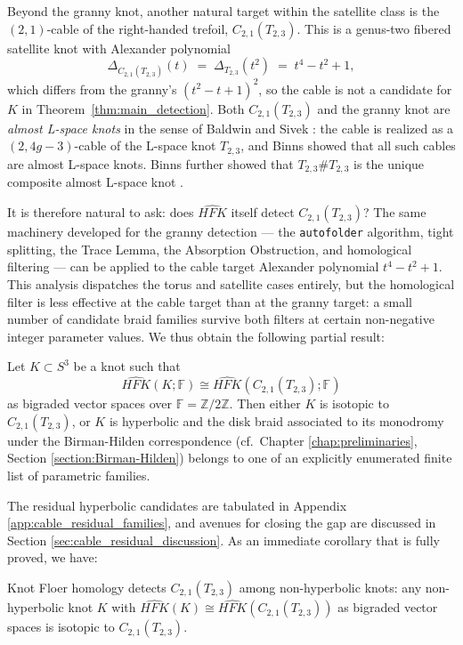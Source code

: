 Beyond the granny knot, another natural target within the satellite class is the $(2,1)$-cable of the right-handed trefoil, $C_{2,1}(T_{2,3})$. This is a genus-two fibered satellite knot with Alexander polynomial
\[
\Delta_{C_{2,1}(T_{2,3})}(t) \;=\; \Delta_{T_{2,3}}(t^2) \;=\; t^4 - t^2 + 1,
\]
which differs from the granny's $(t^2-t+1)^2$, so the cable is not a candidate for $K$ in Theorem~\ref{thm:main_detection}. Both $C_{2,1}(T_{2,3})$ and the granny knot are \emph{almost L-space knots} in the sense of Baldwin and Sivek \cite{BaldwinSivek2024}: the cable is realized as a $(2, 4g-3)$-cable of the L-space knot $T_{2,3}$, and Binns \cite{Binns2023} showed that all such cables are almost L-space knots. Binns further showed that $T_{2,3} \# T_{2,3}$ is the unique composite almost L-space knot \cite{Binns2023}.

It is therefore natural to ask: does $\widehat{HFK}$ itself detect $C_{2,1}(T_{2,3})$? The same machinery developed for the granny detection --- the \texttt{autofolder} algorithm, tight splitting, the Trace Lemma, the Absorption Obstruction, and homological filtering --- can be applied to the cable target Alexander polynomial $t^4 - t^2 + 1$. This analysis dispatches the torus and satellite cases entirely, but the homological filter is less effective at the cable target than at the granny target: a small number of candidate braid families survive both filters at certain non-negative integer parameter values. We thus obtain the following partial result:

\begin{theorem}\label{thm:cable_detection_partial_intro}
Let $K \subset S^3$ be a knot such that
\[
\widehat{HFK}(K; \mathbb{F}) \cong \widehat{HFK}(C_{2,1}(T_{2,3}); \mathbb{F})
\]
as bigraded vector spaces over $\mathbb{F} = \mathbb{Z}/2\mathbb{Z}$. Then either $K$ is isotopic to $C_{2,1}(T_{2,3})$, or $K$ is hyperbolic and the disk braid associated to its monodromy under the Birman-Hilden correspondence (cf.\ Chapter \ref{chap:preliminaries}, Section \ref{section:Birman-Hilden}) belongs to one of an explicitly enumerated finite list of parametric families.
\end{theorem}

The residual hyperbolic candidates are tabulated in Appendix \ref{app:cable_residual_families}, and avenues for closing the gap are discussed in Section \ref{sec:cable_residual_discussion}. As an immediate corollary that is fully proved, we have:

\begin{corollary}\label{cor:cable_nonhyperbolic_detection_intro}
Knot Floer homology detects $C_{2,1}(T_{2,3})$ among non-hyperbolic knots: any non-hyperbolic knot $K$ with $\widehat{HFK}(K) \cong \widehat{HFK}(C_{2,1}(T_{2,3}))$ as bigraded vector spaces is isotopic to $C_{2,1}(T_{2,3})$.
\end{corollary}
